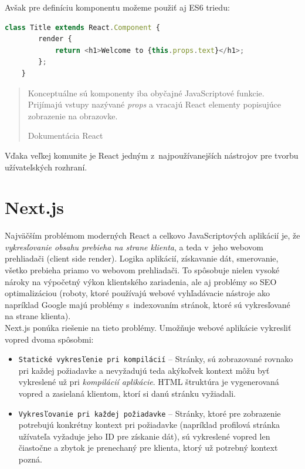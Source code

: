 \medskip

\noindent Avšak pre definíciu komponentu možeme použiť aj ES6 triedu: \\

\begin{lstlisting}[language=TypeScript, caption=Príklad definície triedneho komponentu.]
	class Title extends React.Component {
		render {
			return <h1>Welcome to {this.props.text}</h1>;
		};
	}
\end{lstlisting}

\medskip

\blockquote[Dokumentácia React \cite{React}]{Konceptuálne sú komponenty iba obyčajné JavaScriptové funkcie. Prijímajú vstupy nazývané \emph{props} a vracajú React elementy popisujúce zobrazenie na obrazovke.}

\noindent Vďaka veľkej komunite je React jedným z~najpoužívanejších nástrojov pre tvorbu užívateľských rozhraní. 

\section{Next.js}
\label{theory:nextjs}
Najväčším problémom moderných React a celkovo JavaScriptových aplikácií je, že \emph{vykresľovanie obsahu prebieha na strane klienta}, a teda v~jeho webovom prehliadači (client side render). Logika aplikácií, získavanie dát, smerovanie, všetko prebieha priamo vo webovom prehliadači. To spôsobuje nielen vysoké nároky na výpočetný výkon klientského zariadenia, ale aj problémy so SEO optimalizáciou (roboty, ktoré používajú webové vyhľadávacie nástroje ako napríklad Google majú problémy s~indexovaním stránok, ktoré sú vykresľované na strane klienta). \\

\noindent Next.js ponúka riešenie na tieto problémy. Umožňuje webové aplikácie vykresliť vopred dvoma spôsobmi:

\begin{itemize}
	\item \texttt{Statické vykresľenie pri kompilácií} -- Stránky, sú zobrazované rovnako pri každej požiadavke a nevyžadujú teda akýkoľvek kontext môžu byť vykreslené už pri \emph{kompilácií aplikácie}. HTML štruktúra je vygenerovaná vopred a zasielaná klientom, ktorí si danú stránku vyžiadali.
	\item \texttt{Vykresľovanie pri každej požiadavke} -- Stránky, ktoré pre zobrazenie potrebujú konkrétny kontext pri požiadavke (napríklad profilová stránka užívateľa vyžaduje jeho ID pre získanie dát), sú vykreslené vopred len čiastočne a zbytok je prenechaný pre klienta, ktorý už potrebný kontext pozná.
\end{itemize}

